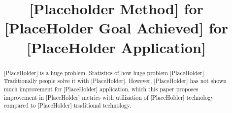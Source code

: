 \documentclass[conference]{IEEEtran}
\begin{document}
\title{[Placeholder Method] for [PlaceHolder Goal Achieved] for [PlaceHolder Application]}

\author{
\and
{}
}


% 








\maketitle

\begin{abstract}
[PlaceHolder] is a huge problem. Statistics of how huge problem [PlaceHolder]. Traditionally people solve it with [PlaceHolder]. However, [PlaceHolder] has not shown much improvement for [PlaceHolder] application, which this paper proposes improvement in [PlaceHolder] metrics with utilization of [PlaceHolder] technology compared to [PlaceHolder] traditional technology.
\end{abstract}
\end{document}
